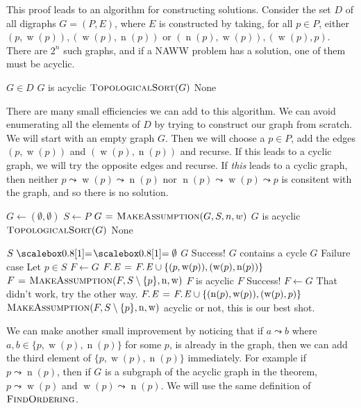 \documentclass{article}
\DeclareMathOperator{\w}{w}
\DeclareMathOperator{\n}{n}
\begin{document}
This proof leads to an algorithm for constructing solutions. Consider the set $D$ of all digraphs $G=(P,E)$, where $E$ is constructed by taking, for all $p \in P$, either  $(p,\w(p)), (\w(p),\n(p))$ or $(\n(p),\w(p)),(\w(p),p)$. There are $2^n$ such graphs, and if a NAWW problem has a solution, one of them must be acyclic.

\begin{codebox}
\li \For $G\in D$
\li     \Do
        \If $G$ is acyclic
\li         \Do
                \Return $\textnormal{\scshape TopologicalSort}(G)$
        \End
    \End
\li \Return None
\end{codebox}
    
There are many small efficiencies we can add to this algorithm. We can avoid enumerating all the elements of $D$ by trying to construct our graph from scratch. We will start with an empty graph $G$. Then we will choose a $p \in P$, add the edges $(p,\w(p))$ and $(\w(p),\n(p))$ and recurse. If this leads to a cyclic graph, we will try the opposite edges and recurse. If \emph{this} leads to a cyclic graph, then neither $p \leadsto \w(p) \leadsto \n(p)$ nor $\n(p) \leadsto \w(p) \leadsto p$ is consitent with the graph, and so there is no solution.

\begin{codebox}
\li $G \gets (\emptyset, \emptyset)$
\li $S \gets P$
\li $G \mathrel{\hspace{1pt}=\hspace{1pt}} \textnormal{\scshape MakeAssumption}(G,S,n,w)$
\li \If $G$ is acyclic
\li     \Do
        \Return $\textnormal{\scshape TopologicalSort}(G)$
    \End
\li \Return None
\end{codebox}


\begin{codebox}
\Procname{$\proc{MakeAssumption}(G,S,\n,\w)$}
\li \If $S \isequal \emptyset$
\li     \Then
        \Return $G$ \Comment Success!
    \End
\li \If $G$ contains a cycle
\li     \Then
        \Return $G$ \Comment Failure case
    \End
\li Let $p \in S$
\li $F \gets G$
\li $\attrib{F}{E} \gets \attrib{F}{E} \cup \{(p,\w(p)), (\w(p),\n(p))\}$
\li $F \gets \proc{MakeAssumption}(F,S\setminus \{p\}, \n, \w)$
\li \If $F$ is acyclic
\li     \Do
        \Return $F$ \Comment Success!
    \End
\li $F \gets G$ \Comment That didn't work, try the other way.
\li $\attrib{F}{E} \gets \attrib{F}{E} \cup \{(\n(p), \w(p)), (\w(p),p)\}$
\li \Return $\proc{MakeAssumption}(F,S\setminus \{p\}, \n, \w)$ \Comment acyclic or not, this is our best shot.
\end{codebox}

We can make another small improvement by noticing that if $a \leadsto b$ where $a,b \in \{p, \w(p), \n(p)\}$ for some $p$, is already in the graph, then we can add the third element of $\{p, \w(p), \n(p)\}$ immediately. For example if $p \leadsto \n(p)$, then if $G$ is a subgraph of the acyclic graph in the theorem, $p \leadsto \w(p)$ and $\w(p) \leadsto \n(p)$. We will use the same definition of $\textnormal{\scshape FindOrdering}$.
\end{document}
